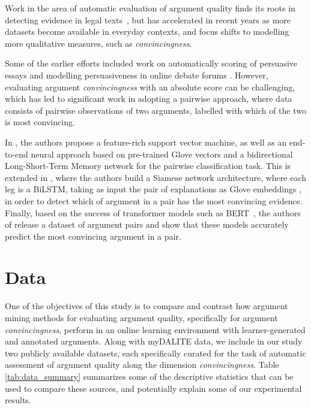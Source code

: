 \documentclass[runningheads]{llncs}
\begin{document}
Work in the area of automatic evaluation of argument quality finds its roots in 
detecting evidence in legal texts~\cite{moens_automatic_2007}, but has 
accelerated in recent years as more datasets become available in everyday 
contexts, and focus shifts to modelling more qualitative measures, such as 
\textit{convincingness}. 

Some of the earlier efforts included work on automatically 
scoring of persuasive essays \cite{persing_end--end_2016} and modelling 
persuasiveness in online debate forums \cite{tan_winning_2016}. 
However, evaluating argument \textit{convincingness} with an absolute score can 
be challenging, which has led to significant work in adopting a pairwise 
approach, where data consists of pairwise observations of two arguments, 
labelled with which of the two is most convincing.

	
		

In \cite{habernal_which_2016}, the authors propose a feature-rich support 
vector machine, as well as an end-to-end neural approach based on pre-trained 
Glove vectors and a bidirectional Long-Short-Term Memory network for the 
pairwise classification task. 
This is extended in \cite{gleize_are_2019}, where the authors build a Siamese 
network architecture, where each leg is a BiLSTM, taking as input the pair of 
explanations as Glove embeddings \cite{pennington_glove:_2014}, in order to 
detect which of argument in a pair 
has the most convincing evidence.
Finally, based on the success of transformer models such as 
BERT~\cite{devlin_bert_2018}, the authors of \cite{toledo_automatic_2019}  
release a dataset of argument pairs and show that these models accurately 
predict the most convincing argument in a pair.


\section{Data}

One of the objectives of this study is to compare and contrast how argument 
mining methods for evaluating argument quality, specifically for argument 
\textit{convincingness}, perform in an online learning environment with 
learner-generated and annotated arguments. Along with myDALITE data, we include 
in our study two publicly 
available datasets, each specifically curated for the task of automatic 
assessment of argument quality along the dimension \textit{convincingness}. 
Table \ref{tab:data_summary} summarizes some of the descriptive statistics that 
can be used to compare these sources, and potentially explain some of our 
experimental results.
\end{document}
